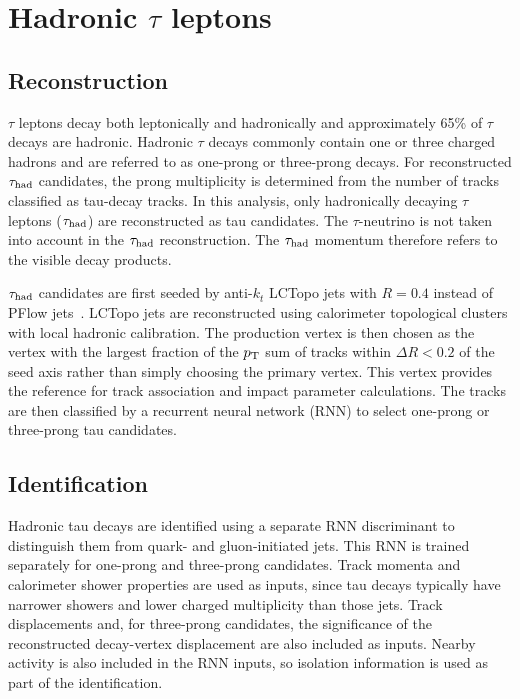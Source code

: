\section{Hadronic \texorpdfstring{$\tau$}{tau} leptons}
\label{sec:ch6_tau}

\subsection{Reconstruction}

$\tau$ leptons decay both leptonically and hadronically and approximately 65\% of $\tau$ decays are hadronic. Hadronic $\tau$ decays commonly contain one or three charged hadrons and are referred to as one-prong or three-prong decays. For reconstructed $\tau_{\mathrm{had}}$ candidates, the prong multiplicity is determined from the number of tracks classified as tau-decay tracks.
In this analysis, only hadronically decaying $\tau$ leptons ($\tau_{\mathrm{had}}$) are reconstructed as tau candidates. The $\tau$-neutrino is not taken into account in the $\tau_{\mathrm{had}}$ reconstruction. The $\tau_{\mathrm{had}}$ momentum therefore refers to the visible decay products.

$\tau_{\mathrm{had}}$ candidates are first seeded by anti-$k_t$ LCTopo jets with $R=0.4$ instead of PFlow jets~\cite{ATLAS2022TauR22}.
LCTopo jets are reconstructed using calorimeter topological clusters with local hadronic calibration.
The production vertex is then chosen as the vertex with the largest fraction of the $p_{\mathrm{T}}$ sum of tracks within $\Delta R<0.2$ of the seed axis rather than simply choosing the primary vertex.
This vertex provides the reference for track association and impact parameter calculations.
The tracks are then classified by a recurrent neural network (RNN) to select one-prong or three-prong tau candidates.

\subsection{Identification}

Hadronic tau decays are identified using a separate RNN discriminant to distinguish them from quark- and gluon-initiated jets.
This RNN is trained separately for one-prong and three-prong candidates.
Track momenta and calorimeter shower properties are used as inputs, since tau decays typically have narrower showers and lower charged multiplicity than those jets.
Track displacements and, for three-prong candidates, the significance of the reconstructed decay-vertex displacement are also included as inputs.
Nearby activity is also included in the RNN inputs, so isolation information is used as part of the identification.

